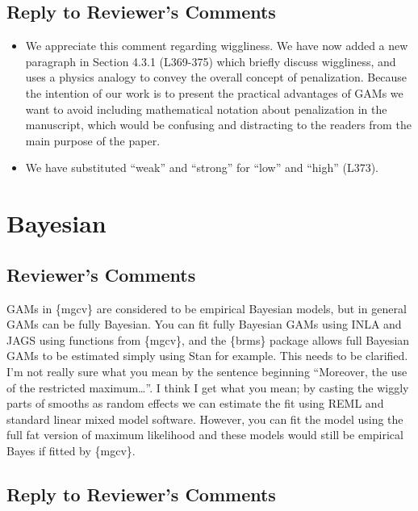 \documentclass[
]{article}
\begin{document}
\hypertarget{section-6}{%
\subsection{\texorpdfstring{\textcolor{reviewersblue} {Reply to Reviewer's Comments}}{}}\label{section-6}}

\begin{itemize}
\item
  We appreciate this comment regarding wiggliness. We have now added a new paragraph in Section 4.3.1 (L369-375) which briefly discuss wiggliness, and uses a physics analogy to convey the overall concept of penalization. Because the intention of our work is to present the practical advantages of GAMs we want to avoid including mathematical notation about penalization in the manuscript, which would be confusing and distracting to the readers from the main purpose of the paper.
\item
  We have substituted ``weak'' and ``strong'' for ``low'' and ``high'' (L373).
\end{itemize}

\hypertarget{bayesian}{%
\section{Bayesian}\label{bayesian}}

\hypertarget{reviewers-comments-6}{%
\subsection{Reviewer's Comments}\label{reviewers-comments-6}}

GAMs in \{mgcv\} are considered to be empirical Bayesian models, but in general GAMs can be fully Bayesian. You can fit fully Bayesian GAMs using INLA and JAGS using functions from \{mgcv\}, and the \{brms\} package allows full Bayesian GAMs to be estimated simply using Stan for example. This needs to be clarified.
I'm not really sure what you mean by the sentence beginning ``Moreover, the use of the restricted maximum\ldots{}''. I think I get what you mean; by casting the wiggly parts of smooths as random effects we can estimate the fit using REML
and standard linear mixed model software. However, you can fit the model using the full fat version of maximum likelihood and these models would still be empirical Bayes if fitted by \{mgcv\}.

\hypertarget{section-7}{%
\subsection{\texorpdfstring{\textcolor{reviewersblue} {Reply to Reviewer's Comments}}{}}\label{section-7}}
\end{document}
